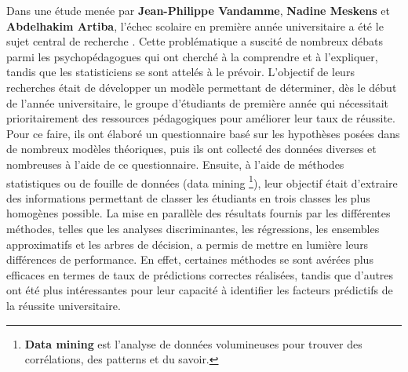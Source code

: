 Dans une étude menée par \textbf{Jean-Philippe Vandamme}, \textbf{Nadine Meskens} et \textbf{Abdelhakim Artiba}, l'échec scolaire en première année universitaire a été le sujet central de recherche \cite{vandamme2023comparison}. Cette problématique a suscité de nombreux débats parmi les psychopédagogues qui ont cherché à la comprendre et à l'expliquer, tandis que les statisticiens se sont attelés à le prévoir.
L'objectif de leurs recherches était de développer un modèle permettant de déterminer, dès le début de l'année universitaire, le groupe d'étudiants de première année qui nécessitait prioritairement des ressources pédagogiques pour améliorer leur taux de réussite. Pour ce faire, ils ont élaboré un questionnaire basé sur les hypothèses posées dans de nombreux modèles théoriques, puis ils ont collecté des données diverses et nombreuses à l'aide de ce questionnaire.
Ensuite, à l'aide de méthodes statistiques ou de fouille de données (data mining\textsuperscript{} \footnote{\textbf{Data mining} est l'analyse de données volumineuses pour trouver des corrélations, des patterns et du savoir.}), leur objectif était d'extraire des informations permettant de classer les étudiants en trois classes les plus homogènes possible.
La mise en parallèle des résultats fournis par les différentes méthodes, telles que les analyses discriminantes, les régressions, les ensembles approximatifs et les arbres de décision, a permis de mettre en lumière leurs différences de performance. En effet, certaines méthodes se sont avérées plus efficaces en termes de taux de prédictions correctes réalisées, tandis que d'autres ont été plus intéressantes pour leur capacité à identifier les facteurs prédictifs de la réussite universitaire.

